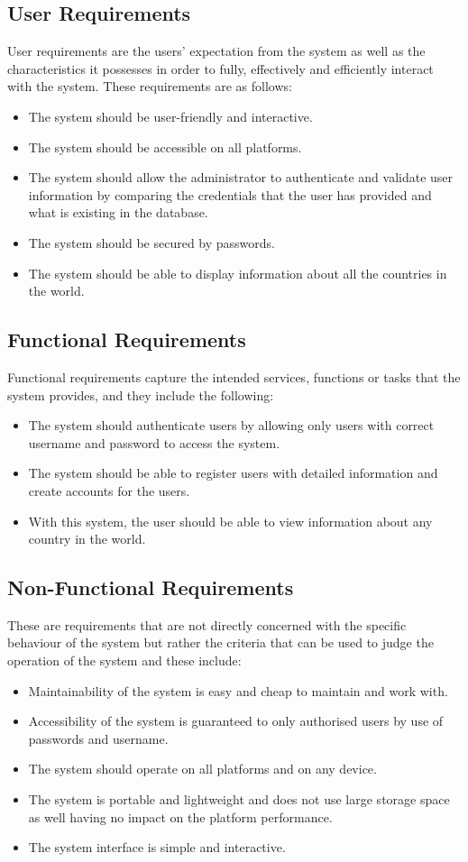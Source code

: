 \documentclass[twoside, a4paper, 12pt]{report}
\begin{document}
\subsection{User Requirements}
User requirements are the users' expectation from the system as well as the characteristics it possesses in order to fully, effectively and efficiently interact with the system. These requirements are as follows:
\begin{itemize}
	\item The system should be user-friendly and interactive.
	\item The system should be accessible on all platforms.
	\item The system should allow the administrator to authenticate and validate user information by comparing the credentials that the user has provided and what is existing in the database.
	\item The system should be secured by passwords.
	\item The system should be able to display information about all the countries in the world.
\end{itemize}

\subsection{Functional Requirements}
Functional requirements capture the intended services, functions or tasks that the system provides, and they include the following:
\begin{itemize}
	\item The system should authenticate users by allowing only users with correct username and password to access the system.
	\item The system should be able to register users with detailed information and create accounts for the users.
	\item With this system, the user should be able to view information about any country in the world.
\end{itemize}

\subsection{Non-Functional Requirements}
These are requirements that are not directly concerned with the specific behaviour of the system but rather the criteria that can be used to judge the operation of the system and these include:
\begin{itemize}
	\item Maintainability of the system is easy and cheap to maintain and work with.
	\item Accessibility of the system is guaranteed to only authorised users by use of passwords and username.
	\item The system should operate on all platforms and on any device.
	\item The system is portable and lightweight and does not use large storage space as well having no impact on the platform performance.
	\item The system interface is simple and interactive.
\end{itemize}
\end{document}
